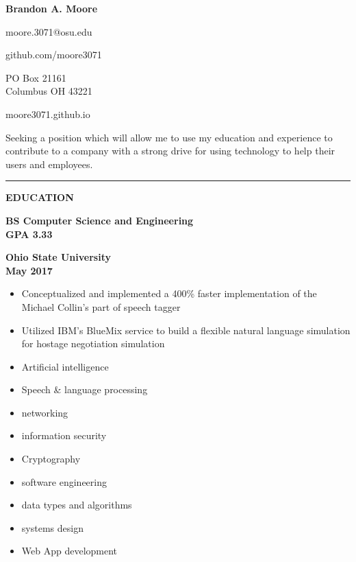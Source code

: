 \documentclass[letterpaper,10pt]{article}
\newcommand{\topic}[1]{\vspace{2mm} \rule[.5em]{10mm}{.2pt} {\large \bfseries #1} \xrfill[.5em]{.2pt} \newline \vspace{-2mm}}
\newcommand{\fullentry}[3] { \parbox[t]{.6\textwidth}{\large \bfseries #1} \hfill \parbox[t]{.4\textwidth}{\bfseries \raggedleft #2 \\ #3} \vspace{.5mm} \newline}
\newcommand{\contact}[1]{\parbox{.18\textwidth}{\centering #1}}
\begin{document}
	\begin{center} \huge \bfseries
		Brandon A. Moore
	\end{center}
	\contact{moore.3071@osu.edu} \hfill \contact{github.com/moore3071} \hfill \contact{PO Box 21161\\Columbus OH 43221} \hfill \contact{moore3071.github.io}


	\vspace{5mm}

	 Seeking a position which will allow me to use my education and experience to contribute to a company with a strong drive for using technology to help their users and employees.

	\vspace{3mm}

	\topic{EDUCATION}

		\fullentry{BS Computer Science and Engineering\\GPA 3.33}{Ohio State University}{May 2017}
			\vspace{-7mm}
			\begin{itemize}
				\item Conceptualized and implemented a 400\% faster implementation of the Michael Collin's part of speech tagger
				\item Utilized IBM's BlueMix service to build a flexible natural language simulation for hostage negotiation simulation
			\end{itemize}
			\begin{multicols}{3}
				\begin{itemize}
					\setlength\itemsep{.1mm}
					\item Artificial intelligence
					\item Speech \& language processing
					\item networking
					\item information security
					\item Cryptography
					\item software engineering
					\item data types and algorithms
					\item systems design
					\item Web App development
				\end{itemize}
			\end{multicols}
\end{document}
